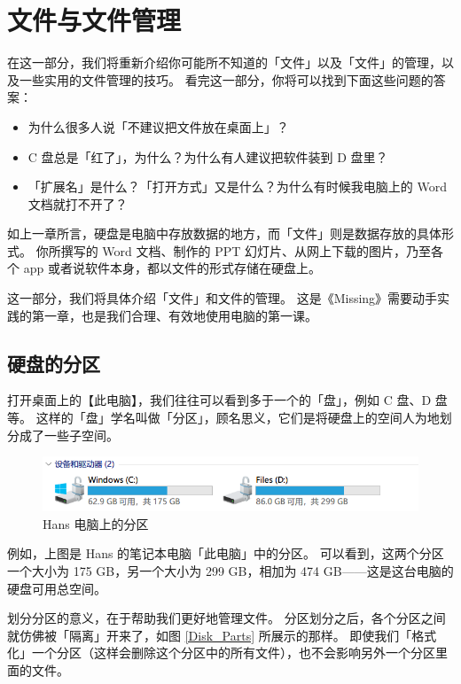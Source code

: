 \chapter{文件与文件管理}
\label{files-and-file-management}

\begin{intro}
  在这一部分，我们将重新介绍你可能所不知道的「文件」以及「文件」的管理，以及一些实用的文件管理的技巧。
  看完这一部分，你将可以找到下面这些问题的答案：
  \begin{itemize}
    \item 为什么很多人说「不建议把文件放在桌面上」？
    \item C 盘总是「红了」，为什么？为什么有人建议把软件装到 D 盘里？
    \item 「扩展名」是什么？「打开方式」又是什么？为什么有时候我电脑上的 Word 文档就打不开了？
  \end{itemize}
\end{intro}

如上一章所言，硬盘是电脑中存放数据的地方，而「文件」则是数据存放的具体形式。
你所撰写的 Word 文档、制作的 PPT 幻灯片、从网上下载的图片，乃至各个 app 或者说软件本身，都以文件的形式存储在硬盘上。

这一部分，我们将具体介绍「文件」和文件的管理。
这是《Missing》需要动手实践的第一章，也是我们合理、有效地使用电脑的第一课。

\section{硬盘的分区}

打开桌面上的【此电脑】，我们往往可以看到多于一个的「盘」，例如 C 盘、D 盘等。
这样的「盘」学名叫做「分区」，顾名思义，它们是将硬盘上的空间人为地划分成了一些子空间。

\begin{figure}[htb!]
  \centering
  \includegraphics[width=13cm]{assets/Hans_Disks.png}
  \caption{Hans 电脑上的分区}
  \label{Hans_Disks}
\end{figure}

例如，上图是 Hans 的笔记本电脑「此电脑」中的分区。
可以看到，这两个分区一个大小为 175 GB，另一个大小为 299 GB，相加为 474 GB——这是这台电脑的硬盘可用总空间。

划分分区的意义，在于帮助我们更好地管理文件。
分区划分之后，各个分区之间就仿佛被「隔离」开来了，如图 \ref{Disk_Parts} 所展示的那样。
即使我们「格式化」一个分区（这样会删除这个分区中的所有文件），也不会影响另外一个分区里面的文件。

